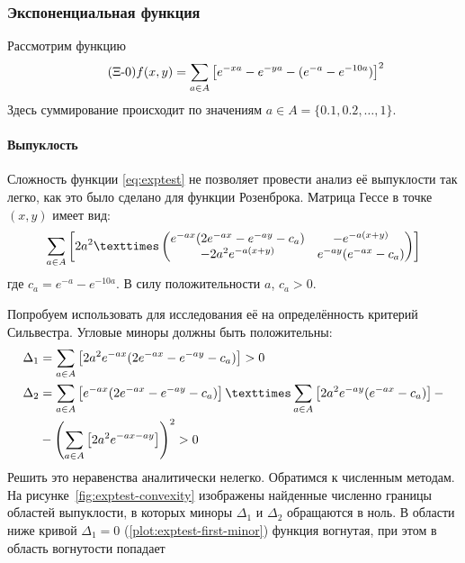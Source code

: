 \subsubsection{Экспоненциальная функция}
\label{sec:exptest}

Рассмотрим функцию
\begin{equation}
  \label{eq:exptest}
  \tag{$\Xi$-\theequation}
  f(x, y) = \sum\limits_{a\in A}\left [
    e^{-xa}-e^{-ya}-(e^{-a}-e^{-10a})\right ]^2
\end{equation}
Здесь суммирование происходит по значениям $a \in A =\{0.1, 0.2, \dotsc, 1\}$.

\paragraph{Выпуклость}

Сложность функции \eqref{eq:exptest} не позволяет провести анализ её
выпуклости так легко, как это было сделано для функции Розенброка.
Матрица Гессе в точке $(x, y)$ имеет вид:
\begin{equation}
  \label{eq:exptest-hess}
  \suml_{a\in A}\left[2a^2×
  \begin{pmatrix}
    e^{-ax}(2e^{-ax}-e^{-ay}-c_a) & -e^{-a(x+y)} \\
    -2a^2e^{-a(x+y)} & e^{-ay}(e^{-ax}-c_a)
  \end{pmatrix}\right]
\end{equation}
где $c_a = e^{-a}-e^{-10a}$. В силу положительности $a$, $c_a>0$.

Попробуем использовать для исследования её на определённость критерий
Сильвестра. Угловые миноры должны быть положительны:
\begin{align*}
  \Delta_1 &= \suml_{a\in A}
  \left[ 2a^2e^{-ax}(2e^{-ax}-e^{-ay}-c_a) \right] > 0\\
  \Delta_2 &= \suml_{a\in A}
  \left[ e^{-ax}(2e^{-ax}-e^{-ay}-c_a) \right]×
  \suml_{a\in A}
  \left[ 2a^2e^{-ay}(e^{-ax}-c_a) \right]-\\
  &-\left(\suml_{a\in A}
  \left[ 2a^2e^{-ax-ay} \right] \right)^2
  > 0
\end{align*}
Решить это неравенства аналитически нелегко. Обратимся к численным
методам. На рисунке \ref{fig:exptest-convexity} изображены найденные
численно границы областей выпуклости, в которых миноры $\Delta_1$ и
$\Delta_2$ обращаются в ноль. В области ниже кривой $\Delta_1=0$
(\ref{plot:exptest-first-minor}) функция вогнутая, при этом в область
вогнутости попадает


